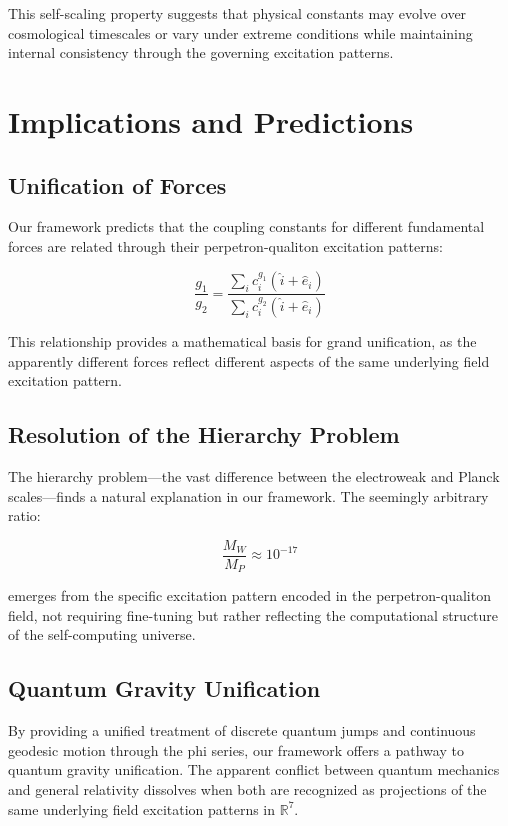 \documentclass{article}
\begin{document}
This self-scaling property suggests that physical constants may evolve over cosmological timescales or vary under extreme conditions while maintaining internal consistency through the governing excitation patterns.

\section{Implications and Predictions}

\subsection{Unification of Forces}

Our framework predicts that the coupling constants for different fundamental forces are related through their perpetron-qualiton excitation patterns:

\begin{equation}
\frac{g_1}{g_2} = \frac{\sum_{i} c_i^{g_1} (\hat{i} + \hat{e}_i)}{\sum_{i} c_i^{g_2} (\hat{i} + \hat{e}_i)}
\end{equation}

This relationship provides a mathematical basis for grand unification, as the apparently different forces reflect different aspects of the same underlying field excitation pattern.

\subsection{Resolution of the Hierarchy Problem}

The hierarchy problem—the vast difference between the electroweak and Planck scales—finds a natural explanation in our framework. The seemingly arbitrary ratio:

\begin{equation}
\frac{M_W}{M_P} \approx 10^{-17}
\end{equation}

emerges from the specific excitation pattern encoded in the perpetron-qualiton field, not requiring fine-tuning but rather reflecting the computational structure of the self-computing universe.

\subsection{Quantum Gravity Unification}

By providing a unified treatment of discrete quantum jumps and continuous geodesic motion through the phi series, our framework offers a pathway to quantum gravity unification. The apparent conflict between quantum mechanics and general relativity dissolves when both are recognized as projections of the same underlying field excitation patterns in $\mathbb{R}^7$.
\end{document}
